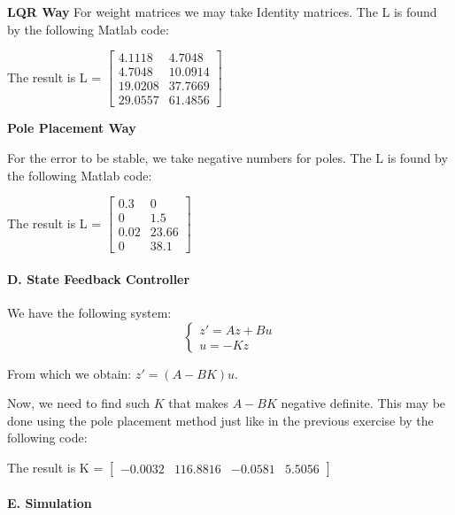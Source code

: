 \documentclass{article}
\begin{document}
\noindent
\textbf{LQR Way}
For weight matrices we may take Identity matrices. The L is found by the following Matlab code:


\noindent
The result is L = 
$
\begin{bmatrix}
4.1118 & 4.7048 \\
4.7048 & 10.0914 \\
19.0208 & 37.7669 \\
 29.0557 & 61.4856
\end{bmatrix}
$

\noindent
\textbf{Pole Placement Way}
\leavevmode

\noindent
For the error to be stable, we take negative numbers for poles. The L is found by the following Matlab code:


\noindent
The result is L = 
$
\begin{bmatrix}
0.3 & 0 \\
0 & 1.5 \\
0.02 & 23.66 \\
0 & 38.1
\end{bmatrix}
$

\paragraph{D. State Feedback Controller}
\leavevmode

\noindent
We have the following system:
$$
        \left\{ \begin{array}{ll} 
            z' = Az + Bu\\
            u = -Kz
        \end{array} \right.
$$

\noindent
From which we obtain: $z' = (A - BK)u$.

\noindent
Now, we need to find such $K$ that makes $A - BK$ negative definite. This may be done using the pole placement method just like in the previous exercise by the following code:



The result is K = 
$
\begin{bmatrix}
-0.0032 & 116.8816 &   -0.0581 & 5.5056 
\end{bmatrix}
$

\paragraph{E. Simulation}
\leavevmode
\end{document}
